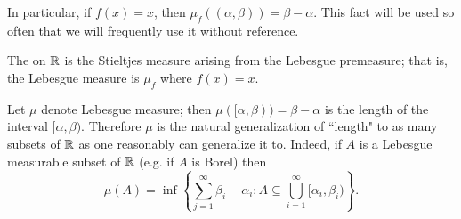 \begin{subsec}
In particular, if $f(x) = x$, then $\mu_f((\alpha, \beta)) = \beta - \alpha$.
This fact will be used so often that we will frequently use it without reference.
\end{subsec}

\begin{definition}
The  on $\mathbb{R}$ is the Stieltjes measure arising from the Lebesgue premeasure; that is, the Lebesgue measure is $\mu_f$ where $f(x) = x$.
\end{definition}

\begin{subsec}
Let $\mu$ denote Lebesgue measure; then $\mu([\alpha, \beta)) = \beta - \alpha$ is the length of the interval $[\alpha, \beta)$.
Therefore $\mu$ is the natural generalization of ``length" to as many subsets of $\mathbb{R}$ as one reasonably can generalize it to.
Indeed, if $A$ is a Lebesgue measurable subset of $\mathbb{R}$ (e.g. if $A$ is Borel) then
\begin{equation}
\label{lebesgue measure formula}
\mu(A) = \inf \left\{\sum_{j=1}^\infty \beta_i - \alpha_i: A \subseteq \bigcup_{i=1}^\infty [\alpha_i, \beta_i)\right\}.
\end{equation}
\end{subsec}

